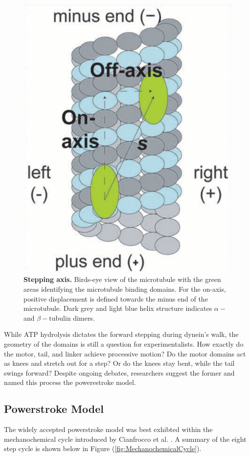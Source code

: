 \begin{figure}[H]
	\centering
	\includegraphics[width=0.3\columnwidth]{Figures/Onaxis.png}
	\caption[Stepping Axis]{\textbf{Stepping axis.} Birds-eye view of the microtubule with the green areas identifying the microtubule binding domains. For the on-axis, positive displacement is defined towards the minus end of the microtubule. Dark grey and light blue helix structure indicates $\alpha-$ and $\beta-$tubulin dimers. \cite{Dewitt2012} }
	\label{fig:axis}
\end{figure}

While ATP hydrolysis dictates the forward stepping during dynein's walk, the geometry of the domains is still a question for experimentalists. How exactly do the motor, tail, and linker achieve processive motion? Do the motor domains act as knees and stretch out for a step? Or do the knees stay bent, while the tail swings forward? Despite ongoing debates, researchers suggest the former and named this process the powerestroke model. 



\subsection{Powerstroke Model}

The widely accepted powerstroke model was best exhibted within the mechanochemical cycle introduced by Cianfrocco et al. \cite{Cianfrocco2015mechanism}. A summary of the eight step cycle is shown below in Figure (\ref{fig:MechanochemicalCycle}).

